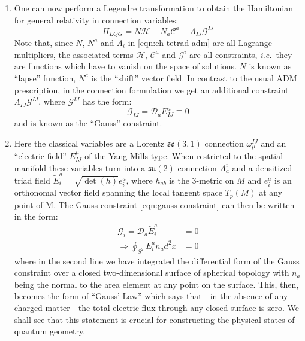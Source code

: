 \documentclass[preprint]{SciPost}
\newcommand{\ie}{\textit{i.e.}~}
\newcommand{\mc}[1]{\mathcal{#1}}
\newcommand{\mf}[1]{\mathfrak{#1}}
\theoremstyle{plain} %
\begin{document}
\begin{enumerate}[label=\arabic*.]
\begin{equation}
		\end{equation}
		is the momentum conjugate to $ A $; $ \epsilon^{abc} $ is the anti-symmetric tensor living only on the spatial slices. The inner integral is over the spatial 3-manifolds $ M $ which are the ``leaves'' of our $ 3+1 $ decomposition.
		\item One can now perform a Legendre transformation to obtain the Hamiltonian for general relativity in connection variables:
		\begin{equation}\label{eqn:tetrad-hamiltonian}
		H_{LQG} = N \mathcal{H} - N_{a} \mathcal{C}^{a} - \Lambda_{IJ} \mc{G}^{IJ}
		\end{equation}
		Note that, since $ N $, $ N^a $ and $ \Lambda_i $ in \eqref{eqn:eh-tetrad-adm} are all Lagrange multipliers, the associated terms $ \mc{H} $, $ \mc{C}^a $ and $ \mc{G}^i $ are all constraints, \ie they are functions which have to vanish on the space of solutions. $ N $ is known as ``lapse'' function, $ N^a $ is the ``shift'' vector field. In contrast to the usual ADM prescription, in the connection formulation we get an additional constraint $ \Lambda_{IJ} \mc{G}^{IJ} $, where $ \mc{G}^{IJ} $ has the form:
		\begin{equation}\label{eqn:gauss-constraint}
		\mc{G}_{IJ} = \mc{D}_a E^a_{IJ} \equiv 0
		\end{equation}
		and is known as the ``Gauss'' constraint.
		\item Here the classical variables are a Lorentz $ \mf{so}(3,1) $ connection $ \omega_\mu^{IJ} $ and an ``electric field'' $ E^\mu_{IJ} $ of the Yang-Mills type. When restricted to the spatial manifold these variables turn into a $ \mf{su(2)} $ connection $ A_a^i $ and a densitized triad field $ \tilde E^a_i = \sqrt{\det(h)} e^a_i$, where $ h_{ab} $ is the 3-metric on $ M $ and $ e^a_i $ is an orthonomal vector field spanning the local tangent space $ T_p (M) $ at any point of M. The Gauss constraint \eqref{eqn:gauss-constraint} can then be written in the form:
		\begin{subequations}
			\begin{align}
			\mc{G}_i = \mc{D}_a \tilde E^a_{i} & = 0 \label{eqn:gauss-constraint-v2} \\
			\Rightarrow \oint_{S^2} E^a_i n_a d^2 x & = 0 \label{eqn:gauss-constraint-v3}
			\end{align}
		\end{subequations}
		where in the second line we have integrated the differential form of the Gauss constraint over a closed two-dimensional surface of spherical topology with $ n_a $ being the normal to the area element at any point on the surface. This, then, becomes the form of ``Gauss' Law'' which says that - in the absence of any charged matter - the total electric flux through any closed surface is zero. We shall see that this statement is crucial for constructing the physical states of quantum geometry.
	\end{enumerate}
\end{document}
